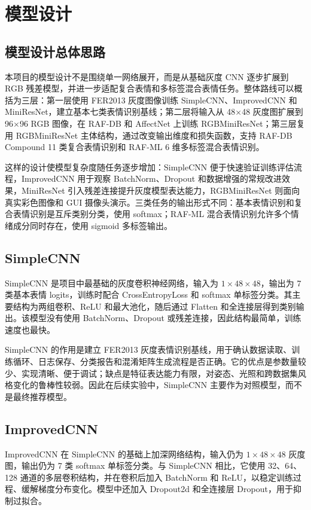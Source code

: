 \documentclass[UTF8,a4paper,12pt]{ctexart}
\begin{document}
\section{模型设计}

\subsection{模型设计总体思路}

本项目的模型设计不是围绕单一网络展开，而是从基础灰度 CNN 逐步扩展到 RGB 残差模型，并进一步适配复合表情和多标签混合表情任务。整体路线可以概括为三层：第一层使用 FER2013 灰度图像训练 SimpleCNN、ImprovedCNN 和 MiniResNet，建立基本七类表情识别基线；第二层将输入从 48$\times$48 灰度图扩展到 96$\times$96 RGB 图像，在 RAF-DB 和 AffectNet 上训练 RGBMiniResNet；第三层复用 RGBMiniResNet 主体结构，通过改变输出维度和损失函数，支持 RAF-DB Compound 11 类复合表情识别和 RAF-ML 6 维多标签混合表情识别。

这样的设计使模型复杂度随任务逐步增加：SimpleCNN 便于快速验证训练评估流程，ImprovedCNN 用于观察 BatchNorm、Dropout 和数据增强的常规改进效果，MiniResNet 引入残差连接提升灰度模型表达能力，RGBMiniResNet 则面向真实彩色图像和 GUI 摄像头演示。三类任务的输出形式不同：基本表情识别和复合表情识别是互斥类别分类，使用 softmax；RAF-ML 混合表情识别允许多个情绪成分同时存在，使用 sigmoid 多标签输出。

\subsection{SimpleCNN}

SimpleCNN 是项目中最基础的灰度卷积神经网络，输入为 $1\times48\times48$，输出为 7 类基本表情 logits，训练时配合 CrossEntropyLoss 和 softmax 单标签分类。其主要结构为两组卷积、ReLU 和最大池化，随后通过 Flatten 和全连接层得到类别输出。该模型没有使用 BatchNorm、Dropout 或残差连接，因此结构最简单，训练速度也最快。

SimpleCNN 的作用是建立 FER2013 灰度表情识别基线，用于确认数据读取、训练循环、日志保存、分类报告和混淆矩阵生成流程是否正确。它的优点是参数量较少、实现清晰、便于调试；缺点是特征表达能力有限，对姿态、光照和跨数据集风格变化的鲁棒性较弱。因此在后续实验中，SimpleCNN 主要作为对照模型，而不是最终推荐模型。

\subsection{ImprovedCNN}

ImprovedCNN 在 SimpleCNN 的基础上加深网络结构，输入仍为 $1\times48\times48$ 灰度图，输出仍为 7 类 softmax 单标签分类。与 SimpleCNN 相比，它使用 32、64、128 通道的多层卷积结构，并在卷积后加入 BatchNorm 和 ReLU，以稳定训练过程、缓解梯度分布变化。模型中还加入 Dropout2d 和全连接层 Dropout，用于抑制过拟合。
\end{document}
